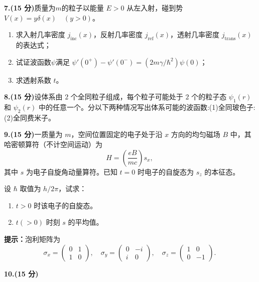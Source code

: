 \textbf{7.(15 分)}质量为$m$的粒子以能量 $E > 0$ 从左入射，碰到势 $V(x) = y\delta(x) \quad (y > 0)$。

\begin{enumerate}
    \item 求入射几率密度 $j_{\text{inc}}(x)$，反射几率密度 $j_{\text{ref}}(x)$，透射几率密度 $j_{\text{trans}}(x)$ 的表达式；
    \item 试证波函数$\psi$满足 $\psi'(0^+) - \psi'(0^-) = \left(2m\gamma/\hbar^2\right) \psi(0)$；
    \item 求透射系数 $t$。
\end{enumerate}

\textbf{8.(15 分)}设体系由 $2$ 个全同粒子组成，每个粒子可能处于 $2$ 个的粒子态 $\psi_1(r)$ 和 $\psi_2(r)$ 中的任意一个。分以下两种情况写出体系可能的波函数:(1)全同玻色子:(2)全同费米子。

\textbf{9.(15 分)}一质量为 $m$，空间位置固定的电子处于沿 $x$ 方向的均匀磁场 $B$ 中，其哈密顿算符（不计空间运动）为
$$H = \left( \frac{eB}{mc} \right) s_x,~$$
其中 $s$ 为电子自旋角动量算符。已知 $t = 0$ 时电子的自旋态为 $s_z$ 的本征态。

设 $\hbar$ 取值为 $h/2\pi$，试求：
\begin{enumerate}
    \item $t > 0$ 时该电子的自旋态。
    \item $t(> 0)$ 时刻 $s$ 的平均值。
\end{enumerate}

\textbf{提示：}泡利矩阵为
$$\sigma_x = \begin{pmatrix} 0 & 1 \\ 1 & 0 \end{pmatrix}, \quad \sigma_y = \begin{pmatrix} 0 & -i \\ i & 0 \end{pmatrix}, \quad \sigma_z = \begin{pmatrix} 1 & 0 \\ 0 & -1 \end{pmatrix}.~$$



\textbf{10.(15 分)}
